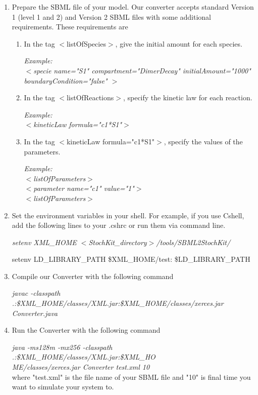 \documentclass[12pt]{article}
\begin{document}
\begin{enumerate}
\item  Prepare the SBML file of your model. Our converter accepts standard Version 1
(level 1 and 2) and Version 2 SBML files with some
additional requirements.
These requirements are
\begin{enumerate}
\item In the tag $<$listOfSpecies$>$, give the initial amount for each species.

{\it
   Example: \\
     $<$specie name="S1" compartment="DimerDecay" initialAmount="1000" boundaryCondition="false" $>$
}

\item In the tag $<$listOfReactions$>$, specify the kinetic law for each reaction.

{\it
   Example: \\
     $<$kineticLaw formula="c1*S1"$>$
}

\item In the tag $<$kineticLaw formula="c1*S1"$>$, specify the values of the parameters.

{\it
   Example: \\

    $<$listOfParameters$>$ \\
      $<$parameter name="c1" value="1"$>$ \\
    $<$listOfParameters$>$
}

\end{enumerate}

\item Set the environment variables in your shell. For example, if you use Cshell,
add the following lines to your .cshrc or run them via command line.

{\it
     setenv XML\_HOME $<$StochKit\_directory$>$/tools/SBML2StochKit/

     setenv  LD\_LIBRARY\_PATH \$XML\_HOME/test: \$LD\_LIBRARY\_PATH
}
\item Compile our Converter with the following command

{\it
   javac -classpath .:\$XML\_HOME/classes/XML.jar:\$XML\_HOME/classes/xerces.jar Converter.java
}

\item Run the Converter with the following command

{\it
   java -ms128m -mx256 -classpath .:\$XML\_HOME/classes/XML.jar:\$XML\_HO\\
    ME/classes/xerces.jar Converter test.xml 10 \\
}
where "test.xml" is the file name of your SBML file and "10" is final time you want to simulate
your system to.

\end{enumerate}
\end{document}
